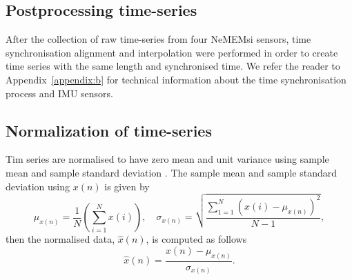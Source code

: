 \subsection{Postprocessing time-series}
After the collection of raw time-series from four NeMEMsi sensors,
time synchronisation alignment and interpolation were performed 
in order to create time series with the same length and synchronised time.
We refer the reader to Appendix~\ref{appendix:b} for technical information 
about the time synchronisation process and IMU sensors.

\subsection{Normalization of time-series}
Tim series are normalised to have zero mean and unit variance 
using sample mean and sample standard deviation \citep{loffe2015}.
The sample mean and sample standard deviation using $x(n)$ is given by
\begin{equation}\label{eq:ms}
\mu_{x(n)}= \frac{1}{N} ( \sum_{i=1}^N x(i) ), \quad  \sigma_{x(n)} =  \sqrt{ \frac{  \sum_{1=1}^N ( x(i) - \mu_{x(n)} )^2 }{ N-1 }  },      
\end{equation}
then the normalised data, $\hat{x}(n)$, is computed as follows
\begin{equation}\label{eq:normalization}
\hat{x} (n) = \frac{   x(n) -  \mu_{x(n)}  }{   \sigma_{x(n)} }.   
\end{equation}

